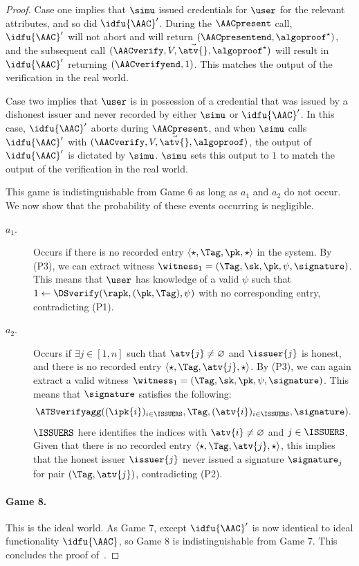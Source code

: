 \begin{proof}
  Case one implies that $\simu$ issued credentials for $\user$ for the relevant
attributes, and so did $\idfu{\AAC}'$.  During the $\AACpresent$ call,
$\idfu{\AAC}'$ will not abort and will return $(\AACpresentend,
\algoproof^\star)$, and the subsequent call $(\AACverify, V, \vec{\atv{}},
\algoproof^\star)$ will result in $\idfu{\AAC}'$ returning $(\AACverifyend, 1)$.
This matches the output of the verification in the real world.

  Case two implies that $\user$ is in possession of a credential that was issued
by a dishonest issuer and never recorded by either $\simu$ or $\idfu{\AAC}'$.
In this case,  $\idfu{\AAC}'$ aborts during $\AACpresent$, and when $\simu$
calls $\idfu{\AAC}'$ with  $(\AACverify, V, \vec{\atv{}}, \algoproof)$, the
output of $\idfu{\AAC}'$ is dictated by $\simu$.  $\simu$ sets this output to
$1$ to match the output of the verification in the real world.

  This game is indistinguishable from Game 6 as long as $a_1$ and $a_2$ do not
occur. We now show that the probability of these events occurring is negligible.

  \begin{description}

    \item[$a_1$.] Occurs if there is no recorded entry $\langle \star, \Tag,
\pk, \star \rangle$ in the system.  By (P3), we can extract witness $\witness_1
= (\Tag, \sk, \pk, \psi, \signature)$.  This means that $\user$ has knowledge of
a valid $\psi$ such that $1 \leftarrow \DSverify(\rapk, (\pk, \Tag), \psi)$ with
no corresponding entry, contradicting (P1).

    \item[$a_2$.] Occurs if $\exists j \in [1, n]$ such that $\atv{j} \neq
\varnothing$ and $\issuer{j}$ is honest, and there is no recorded entry $\langle
\star, \Tag, \atv{j}, \star \rangle$.  By (P3), we can again extract a valid
witness $\witness_1 = (\Tag, \sk, \pk, \psi, \signature)$.  This means that
$\signature$ satisfies the following:
      \begin{equation*}
	\ATSverifyagg((\ipk{i})_{i\in \ISSUERS},\Tag,(\atv{i})_{i\in\ISSUERS},
\signature).
      \end{equation*}
      $\ISSUERS$ here identifies the indices with $\atv{i} \neq \varnothing$ and
$j \in \ISSUERS$.  Given that there is no recorded entry $\langle \star, \Tag,
\atv{j}, \star \rangle$, this implies that the honest issuer $\issuer{j}$ never
issued a signature $\signature_j$ for pair $(\Tag, \atv{j})$, contradicting
(P2).

  \end{description}

  \paragraph{Game 8.} This is the ideal world. As Game 7, except $\idfu{\AAC}'$
is now identical to ideal functionality $\idfu{\AAC}$, so Game 8 is
indistinguishable from Game 7. This concludes the proof
of~.

\end{proof}

